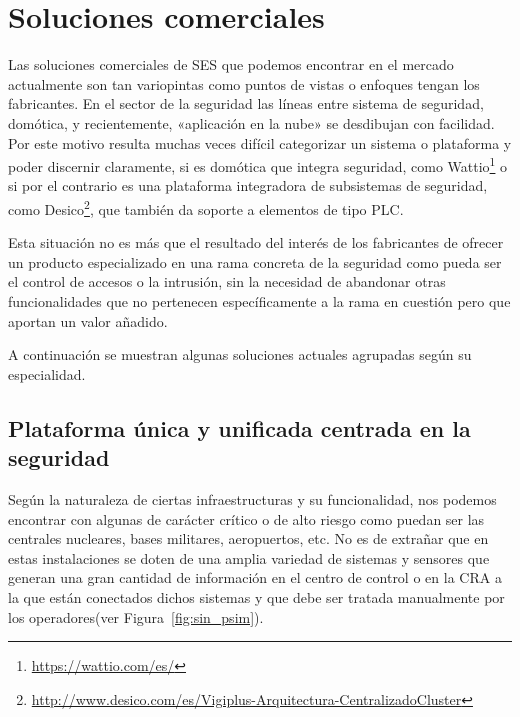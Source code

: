 



\section{Soluciones comerciales}

Las soluciones comerciales de \acs{SES} que podemos encontrar en el mercado actualmente son tan variopintas como puntos de vistas o enfoques tengan los fabricantes. En el sector de la seguridad las líneas entre sistema de seguridad, domótica, y recientemente, «aplicación en la nube» se desdibujan con facilidad. Por este motivo resulta muchas veces difícil categorizar un sistema o plataforma y poder discernir claramente,  si es domótica que integra seguridad, como Wattio\footnote{\url{https://wattio.com/es/}} o si por el contrario es una plataforma integradora de subsistemas de seguridad, como Desico\footnote{\url{http://www.desico.com/es/Vigiplus-Arquitectura-CentralizadoCluster}}, que también da soporte a elementos de tipo \acf{PLC}.

Esta situación no es más que el resultado del interés de los fabricantes de ofrecer un producto especializado en una rama concreta de la seguridad como pueda ser el control de accesos o la intrusión, sin la necesidad de abandonar otras funcionalidades que no pertenecen específicamente a la rama en cuestión pero que aportan un valor añadido.

A continuación se muestran algunas soluciones actuales agrupadas según su especialidad.

\subsection{Plataforma única y unificada centrada en la seguridad}

Según la naturaleza de ciertas infraestructuras y su funcionalidad, nos podemos encontrar con algunas de carácter crítico o de alto riesgo como puedan ser las centrales nucleares, bases militares, aeropuertos, etc. No es de extrañar que en estas instalaciones se doten de una amplia variedad de sistemas y sensores que generan una gran cantidad de información en el centro de control o en la \acs{CRA} a la que están conectados dichos sistemas y que debe ser tratada manualmente por los operadores(ver Figura~\ref{fig:sin_psim}).

